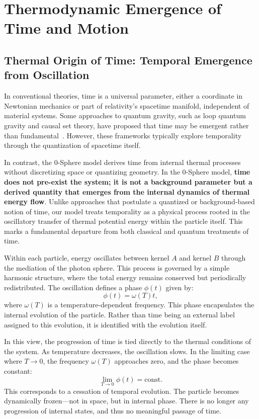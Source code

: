 \documentclass[%
 reprint,
 amsmath,amssymb,
 aps,
]{revtex4-1}
\numberwithin{equation}{section}%
\begin{document}
\section{Thermodynamic Emergence of Time and Motion}
\label{sec:thermodynamic_emergence}

\subsection{Thermal Origin of Time: Temporal Emergence from Oscillation}
\label{subsec:thermal_origin_time}

In conventional theories, time is a universal parameter, either a coordinate in Newtonian mechanics or part of relativity's spacetime manifold, independent of material systems. Some approaches to quantum gravity, such as loop quantum gravity and causal set theory, have proposed that time may be emergent rather than fundamental~\cite{rovelli1991}. However, these frameworks typically explore temporality through the quantization of spacetime itself. 

In contrast, the 0-Sphere model derives time from internal thermal processes without discretizing space or quantizing geometry. In the 0-Sphere model, \textbf{time does not pre-exist the system; it is not a background parameter but a derived quantity that emerges from the internal dynamics of thermal energy flow}. Unlike approaches that postulate a quantized or background-based notion of time, our model treats temporality as a physical process rooted in the oscillatory transfer of thermal potential energy within the particle itself. This marks a fundamental departure from both classical and quantum treatments of time.

Within each particle, energy oscillates between kernel $A$ and kernel $B$ through the mediation of the photon sphere. This process is governed by a simple harmonic structure, where the total energy remains conserved but periodically redistributed. The oscillation defines a phase $\phi(t)$ given by:
\begin{equation} \label{eq:phase_definition}
\phi(t) = \omega(T) t,
\end{equation}
where $\omega(T)$ is a temperature-dependent frequency. This phase encapsulates the internal evolution of the particle. Rather than time being an external label assigned to this evolution, it is identified with the evolution itself.

In this view, the progression of time is tied directly to the thermal conditions of the system. As temperature decreases, the oscillation slows. In the limiting case where $T \to 0$, the frequency $\omega(T)$ approaches zero, and the phase becomes constant:
\begin{equation} \label{eq:phase_freeze}
\lim_{T \to 0} \phi(t) = \text{const.}
\end{equation}
This corresponds to a cessation of temporal evolution. The particle becomes dynamically frozen—not in space, but in internal phase. There is no longer any progression of internal states, and thus no meaningful passage of time.
\end{document}

